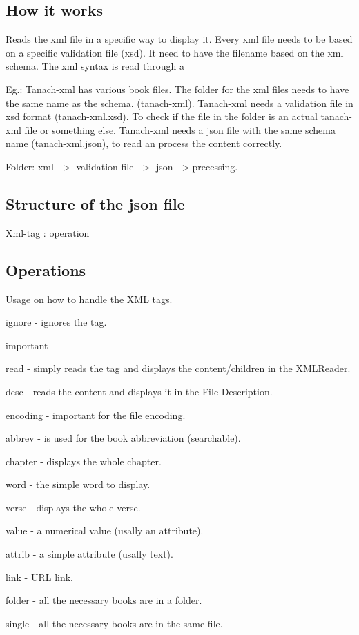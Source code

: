 \subsection*{How it works}

Reads the xml file in a specific way to display it. Every xml file needs to be based on a specific validation file (xsd). It need to have the filename based on the xml schema. The xml syntax is read through a

Eg.\+: Tanach-\/xml has various book files. The folder for the xml files needs to have the same name as the schema. (tanach-\/xml). Tanach-\/xml needs a validation file in xsd format (tanach-\/xml.\+xsd). To check if the file in the folder is an actual tanach-\/xml file or something else. Tanach-\/xml needs a json file with the same schema name (tanach-\/xml.\+json), to read an process the content correctly.

Folder\+: xml -\/$>$ validation file -\/$>$ json -\/$>$precessing.

\subsection*{Structure of the json file}

Xml-\/tag \+: operation

\subsection*{Operations}

Usage on how to handle the X\+ML tags.


\begin{DoxyItemize}
\item ignore -\/ ignores the tag.
\item important
\item read -\/ simply reads the tag and displays the content/children in the X\+M\+L\+Reader.
\item desc -\/ reads the content and displays it in the File Description.
\item encoding -\/ important for the file encoding.
\item abbrev -\/ is used for the book abbreviation (searchable).
\item chapter -\/ displays the whole chapter.
\item word -\/ the simple word to display.
\item verse -\/ displays the whole verse.
\item value -\/ a numerical value (usally an attribute).
\item attrib -\/ a simple attribute (usally text).
\item link -\/ U\+RL link.
\item folder -\/ all the necessary books are in a folder.
\item single -\/ all the necessary books are in the same file. 
\end{DoxyItemize}